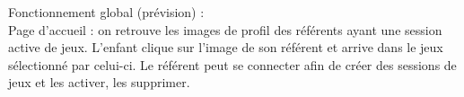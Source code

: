 \documentclass[12pt,a4paper]{report}
\begin{document}
\medbreak
Fonctionnement global (prévision) :
\\Page d'accueil : on retrouve les images de profil des référents ayant une session active de jeux.
L'enfant clique sur l'image de son référent et arrive dans le jeux sélectionné par celui-ci.
Le référent peut se connecter afin de créer des sessions de jeux et les activer, les supprimer.\\
\end{document}
